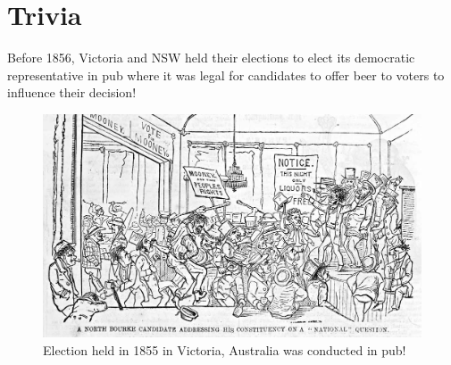 \section{Trivia}
 Before 1856, Victoria and NSW held their elections to elect its 
	  democratic representative in pub where it was legal for 
	  candidates to offer beer to voters to influence their 
	  decision! 
	  
	   \begin{figure}[htb]
	\begin{center}
	\includegraphics[scale=0.25]{NorthBourke.jpg}
	\caption{Election held in 1855 in Victoria, Australia 
	  was conducted in pub!}
	\end{center}
  \end{figure}   
  

